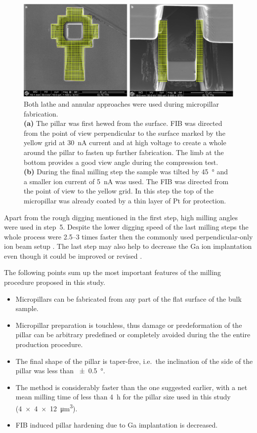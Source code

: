 \begin{figure}[htbp!] 
\centering    
\includegraphics[width=1\textwidth]{Micron-Scale_Deformation2}
\caption[Raw and final pillar fabrication]{Both lathe and annular approaches were used during micropillar fabrication.\\
\textbf{(a)} The pillar was first hewed from the surface. FIB was directed from the point of view perpendicular to the surface marked by the yellow grid at \SI{30}{nA} current and at high voltage to create a whole around the pillar to fasten up further fabrication. The limb at the bottom provides a good view angle during the compression test. \\
\textbf{(b)} During the final milling step the sample was tilted by \SI{45}{\degree} and a smaller ion current of \SI{5}{nA} was used. The FIB was directed from the point of view to the yellow grid. In this step the top of the micropillar was already coated by a thin layer of Pt for protection.}
\label{fig:FIB_approaches}
\end{figure}

Apart from the rough digging mentioned in the first step, high milling angles were used in step~5. Despite the lower digging speed of the last milling steps the whole process were \numrange{2.5}{3} times faster then the commonly used perpendicular-only ion beam setup \cite{doi:10.1093/jmicro/dfh078}. The last step may also help to decrease the Ga ion implantation \cite{bei2007effects} even though it could be improved or revised \cite{greer2008comment}.

The following points sum up the most important features of the milling procedure proposed in this study.\begin{itemize}
\item Micropillars can be fabricated from any part of the flat surface of the bulk sample.
\item Micropillar preparation is touchless, thus damage or predeformation of the pillar can be arbitrary predefined or completely avoided during the the entire production procedure.
\item The final shape of the pillar is taper-free, i.e.\ the inclination of the side of the pillar was less than \SI{\pm0.5}{\degree}.
\item The method is considerably faster than the one suggested earlier, with a net mean milling time of less than \SI{4}{\hour} for the pillar size used in this study (\num{4 x 4 x 12}~\si{\micro m^3}).
\item FIB induced pillar hardening due to Ga implantation is decreased.
\end{itemize}

